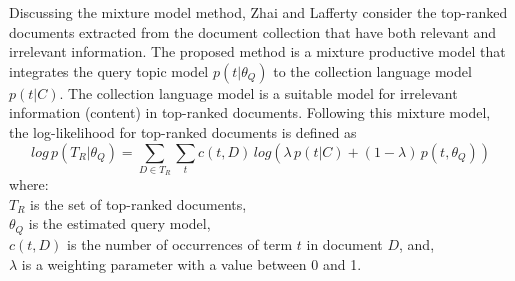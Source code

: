 Discussing the mixture model method, Zhai and Lafferty \cite{zhai2001model} consider the top-ranked documents extracted from the document collection that have both relevant and irrelevant information. The proposed method is a mixture productive model that integrates the query topic model $p(t|\theta_Q)$ to the collection language model $p(t|C)$. The collection language model is a suitable model for irrelevant information (content) in top-ranked documents. Following this mixture model, the log-likelihood for top-ranked documents is defined as
\begin{equation}
log \, p(T_R|\theta_Q)=\sum_{D\in T_R}\sum_t c(t,D)\, log(\lambda \,p(t|C)+ (1-\lambda)\, p(t,\theta_Q))
\end{equation}
where:\\
$T_R$ is the set of top-ranked documents,\\
$\theta_Q$ is the estimated query model,\\
$c(t,D)$ is the number of occurrences of term $t$ in document $D$, and,\\
$\lambda$ is a weighting parameter with a value between 0 and 1.

